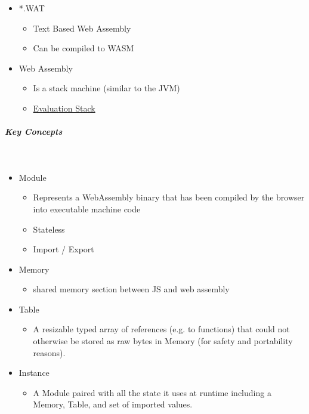 \documentclass[11pt,twoside,landscape]{article}
\begin{document}
\begin{multicols}{3}
\begin{itemize}
\item *.WAT
\begin{itemize}
\item Text Based Web Assembly
\item Can be compiled to WASM
\end{itemize}

\item Web Assembly
\begin{itemize}
\item Is a stack machine (similar to the JVM)
\item \href{../../../roam/20221230171752-what_is_a_evaluation_stack.org}{Evaluation Stack}
\end{itemize}
\end{itemize}
\subparagraph{Key Concepts} \
\label{sec:orgafff8b6}
\begin{itemize}
\item Module
\begin{itemize}
\item Represents a WebAssembly binary that has been compiled by the browser into executable machine code
\item Stateless
\item Import / Export
\end{itemize}
\item Memory
\begin{itemize}
\item shared memory section between JS and web assembly
\end{itemize}
\item Table
\begin{itemize}
\item A resizable typed array of references (e.g. to functions) that could not otherwise be stored as raw bytes in Memory (for safety and portability reasons).
\end{itemize}
\item Instance
\begin{itemize}
\item A Module paired with all the state it uses at runtime including a Memory, Table, and set of imported values.
\end{itemize}
\end{itemize}


\end{multicols}
\end{document}
